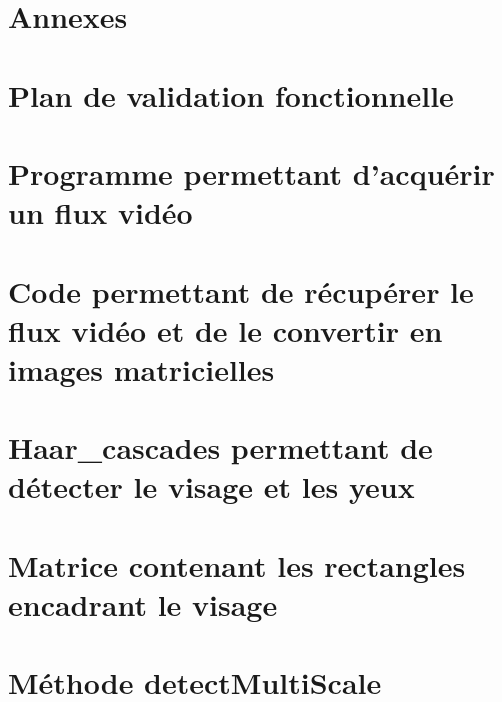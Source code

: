 \documentclass[12pt]{report} %
\begin{document}




%

\newpage


\newpage
\chapter*{Annexes}
\appendix
\chapter{Plan de validation fonctionnelle}
\label{APV}


\chapter{Programme permettant d’acquérir un flux vidéo}
\label{A1}


\chapter{Code permettant de récupérer le flux vidéo et de le convertir en images matricielles}
\label{A2}


\chapter{Haar\_cascades permettant de détecter le visage et les yeux}
\label{A3}


\chapter{Matrice contenant les rectangles encadrant le visage}
\label{A4}


\chapter{Méthode detectMultiScale}
\label{A5}

\end{document}
